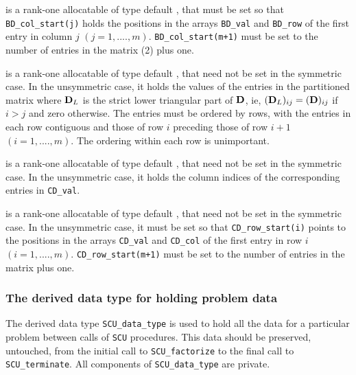 \documentclass{galahad}
\newcommand{\packagename}{SCU}
\begin{document}
\begin{description}
 is a rank-one allocatable of type default \integer, that  
must be set so that {\tt BD\_col\_start(j)} holds the positions 
in the arrays {\tt BD\_val} and {\tt BD\_row} of the first entry in column $j$ 
$(j = 1, ...., m)$. {\tt BD\_col\_start(m+1)} must be set to 
the number of entries in the matrix (2) plus one. 
 
 is a rank-one allocatable of type default  
\realdp, that need not be 
set in the symmetric case. In the unsymmetric case, it 
holds the values of the entries in the partitioned matrix 
where ${\mathbf{D}}_L$ is the strict lower triangular part of ${\mathbf{D}}$, ie, 
$( {\mathbf{D}}_L )_{ij}  =  ( {\mathbf{D}} )_{ij} $ if $i  >  j$ and zero 
otherwise. 
The entries must be ordered by rows, with the entries in each row 
contiguous and those of row 
$i$ preceding those of row $i+1$ $(i = 1, ...., m)$. 
The ordering within each row is unimportant. 
 
 is a rank-one allocatable of type default \integer, 
that need not be set in the symmetric case. In the unsymmetric case, it holds 
the column indices of the corresponding entries in {\tt CD\_val}. 
 
 is a rank-one allocatable of type default \integer, 
that need not be set in the symmetric case. In the unsymmetric case, it  
must be set so that {\tt CD\_row\_start(i)} points to the  
positions in the arrays {\tt CD\_val} and {\tt CD\_col} of the first entry in row $i$ 
$(i = 1, ...., m)$. {\tt CD\_row\_start(m+1)} must be set to 
the number of entries in the matrix  plus one. 
 
\end{description}


\subsubsection{The derived data type for holding problem data}\label{typedata}
The derived data type 
{\tt \packagename\_data\_type} 
is used to hold all the data for a particular problem between calls of 
{\tt \packagename} procedures. 
This data should be preserved, untouched, from the initial call to 
{\tt \packagename\_factorize}
to the final call to
{\tt \packagename\_terminate}.
All components of {\tt \packagename\_data\_type} are private.

\end{document}
